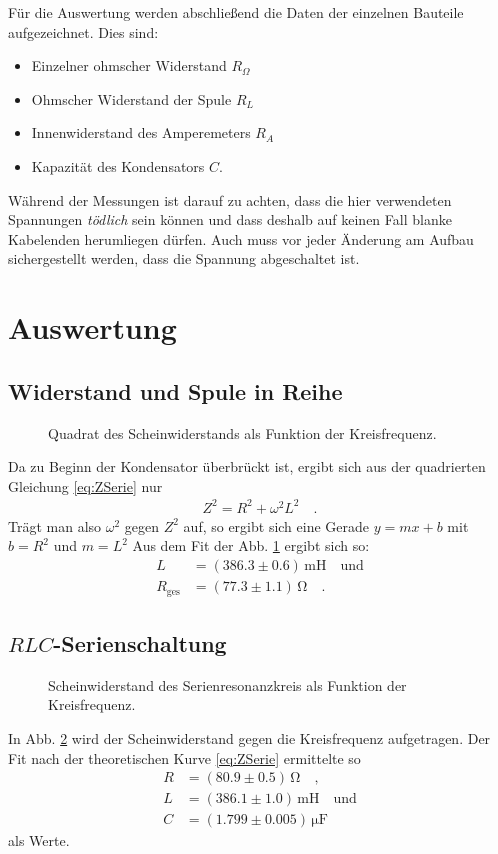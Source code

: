 \documentclass[12pt,a4paper,titlepage,headinclude,bibtotoc]{scrartcl}
\begin{document}
Für die Auswertung werden abschließend die Daten der einzelnen Bauteile aufgezeichnet.
Dies sind:
\begin{itemize}
\item Einzelner ohmscher Widerstand $R_\Omega$
\item Ohmscher Widerstand der Spule $R_L$
\item Innenwiderstand des Amperemeters $R_A$
\item Kapazität des Kondensators $C$.
\end{itemize}

Während der Messungen ist darauf zu achten, dass die hier verwendeten Spannungen \emph{tödlich} sein können und dass deshalb auf keinen Fall blanke Kabelenden herumliegen dürfen.
Auch muss vor jeder Änderung am Aufbau sichergestellt werden, dass die Spannung abgeschaltet ist.

\newpage
\section{Auswertung}
\label{sec:auswertung}
\subsection{Widerstand und Spule in Reihe}
\begin{figure}[!htb]
	\centering
	
	\caption{Quadrat des Scheinwiderstands als Funktion der Kreisfrequenz.}
	\label{fig:messung1}
\end{figure}
Da zu Beginn der Kondensator überbrückt ist, ergibt sich aus der quadrierten Gleichung \eqref{eq:ZSerie} nur
\begin{align*}
Z^2=R^2+\omega^2L^2\quad .
\end{align*}
Trägt man also $\omega^2$ gegen $Z^2$ auf, so ergibt sich eine Gerade $y=mx+b$ mit $b=R^2$ und $m=L^2$
Aus dem Fit der Abb. \ref{fig:messung1} ergibt sich so:
\begin{align*}
	L&=(386.3\pm 0.6)\,\si{\milli\henry}\quad \text{und}\\
	R_\text{ges}&=(77.3 \pm 1.1)\,\si{\ohm}\quad .
\end{align*}
\subsection{$RLC$-Serienschaltung}
\begin{figure}[!htb]
	\centering
	
	\caption{Scheinwiderstand des Serienresonanzkreis als Funktion der Kreisfrequenz.}
	\label{fig:messung2}
\end{figure}
In Abb. \ref{fig:messung2} wird der Scheinwiderstand gegen die Kreisfrequenz aufgetragen.
Der Fit nach der theoretischen Kurve \eqref{eq:ZSerie} ermittelte so 
\begin{align*}
	R &= (80.9 \pm 0.5)\,\si{\ohm}\quad ,\\
	L &= (386.1 \pm 1.0)\,\si{\milli\henry}\quad \text{und}\\
	C &= (1.799 \pm 0.005)\,\si{\micro\farad}
\end{align*}
als Werte.\\
\end{document}
